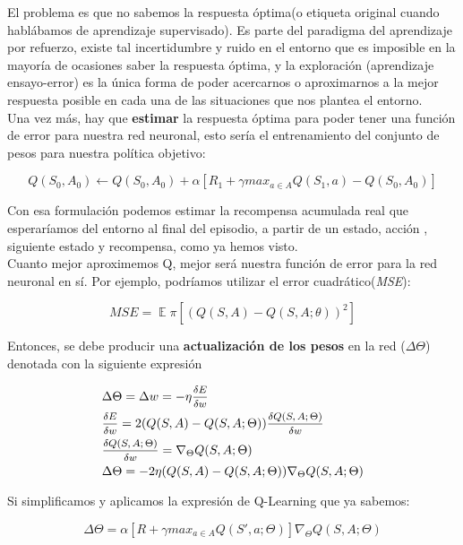 \documentclass[11pt,fleqn]{book} %
\DeclareMathOperator*{\E}{\mathbb{E}}
\begin{document}
El problema es que no sabemos la respuesta óptima(o etiqueta original cuando hablábamos de aprendizaje supervisado). Es parte del paradigma del aprendizaje por refuerzo, existe tal incertidumbre y ruido en el entorno que es imposible en la mayoría de ocasiones saber la respuesta óptima, y la exploración (aprendizaje ensayo-error) es la única forma de poder acercarnos o aproximarnos a la mejor respuesta posible en cada una de las situaciones que nos plantea el entorno. \\

Una vez más, hay que \textbf{estimar} la respuesta óptima para poder tener una función de error para nuestra red neuronal, esto sería el entrenamiento del conjunto de pesos para nuestra política objetivo:

\begin{equation*}
Q(S_0,A_0) \leftarrow Q(S_0,A_0) + \alpha \left[R_1+\gamma max_{a\in A}Q(S_1,a)-Q(S_0,A_0)\right]
\end{equation*}

Con esa formulación podemos estimar la recompensa acumulada real que esperaríamos del entorno al final del episodio, a partir de un estado, acción , siguiente estado y recompensa, como ya hemos visto. \\

Cuanto mejor aproximemos Q, mejor será nuestra función de error para la red neuronal en sí. Por ejemplo, podríamos utilizar el error cuadrático(\textit{MSE}):

\begin{equation*}
MSE= \E\pi[(Q(S,A)-Q(S,A;\theta))^2]
\end{equation*}

Entonces, se debe producir una \textbf{actualización de los pesos} en la red ($\Delta\Theta$) denotada con la siguiente expresión

\begin{align*}
&\Delta\Theta = \Delta w = -\eta \mfrac{\delta E}{\delta w} \\
&\mfrac{\delta E}{\delta w} = 2(Q(S,A)-Q(S,A;\Theta))\mfrac{\delta Q(S,A;\Theta)}{\delta w}\\
&\mfrac{\delta Q(S,A;\Theta)}{\delta w}=\nabla_\Theta Q(S,A;\Theta) \\
&\Delta\Theta=-2\eta(Q(S,A)-Q(S,A;\Theta))\nabla_\Theta Q(S,A;\Theta) 
\end{align*}

Si simplificamos y aplicamos la expresión de Q-Learning que ya sabemos:

\begin{equation*}
\Delta\Theta=\alpha\left[R+\gamma max_{a \in A} Q(S',a;\Theta)\right]\nabla_\Theta Q(S,A;\Theta) 
\end{equation*}
\end{document}
